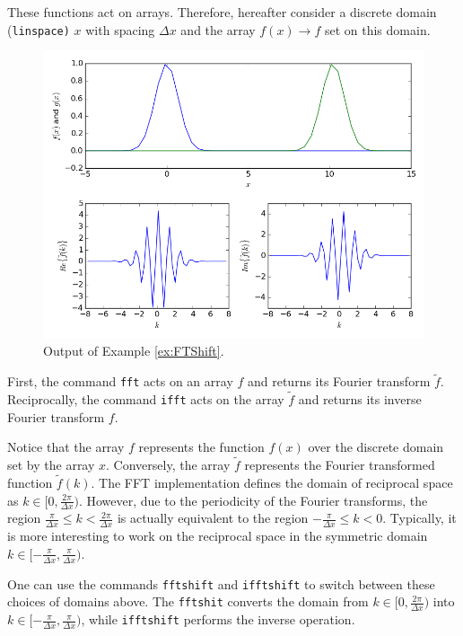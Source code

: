 These functions act on arrays. Therefore, hereafter consider a discrete domain (\texttt{linspace)} $x$ with spacing $\Delta x$ and the array $f(x) \rightarrow f$ set on this domain. 

\begin{figure}[ht!]
 \centering
 \includegraphics[width=14cm,keepaspectratio=true]{./FTShift.png}
 \caption{Output of Example \ref{ex:FTShift}.}
 \label{fig:FTShift}
\end{figure}

First, the command \texttt{fft} acts on an array $f$ and returns its Fourier transform $\tilde{f}$. Reciprocally, the command \texttt{ifft} acts on the array $\tilde{f}$ and returns its inverse Fourier transform $f$.

Notice that the array $f$ represents the function $f(x)$ over the discrete domain set by the array $x$. Conversely, the array $\tilde{f}$ represents the Fourier transformed function $\tilde{f}(k)$. The FFT implementation defines the domain of reciprocal space as $k \in [0, \frac{2\pi}{\Delta x})$. However, due to the periodicity of the Fourier transforms, the region $\frac{\pi}{\Delta x} \leq k < \frac{2\pi}{\Delta x}$ is actually equivalent to the region $-\frac{\pi}{\Delta x} \leq k < 0$. Typically, it is more interesting to work on the reciprocal space in the symmetric domain $k \in [-\frac{\pi}{\Delta x}, \frac{\pi}{\Delta x})$. 

One can use the commands \texttt{fftshift} and \texttt{ifftshift} to switch between these choices of domains above. The \texttt{fftshit} converts the domain from $k \in [0, \frac{2\pi}{\Delta x})$ into $k \in [-\frac{\pi}{\Delta x}, \frac{\pi}{\Delta x})$, while \texttt{ifftshift} performs the inverse operation.

